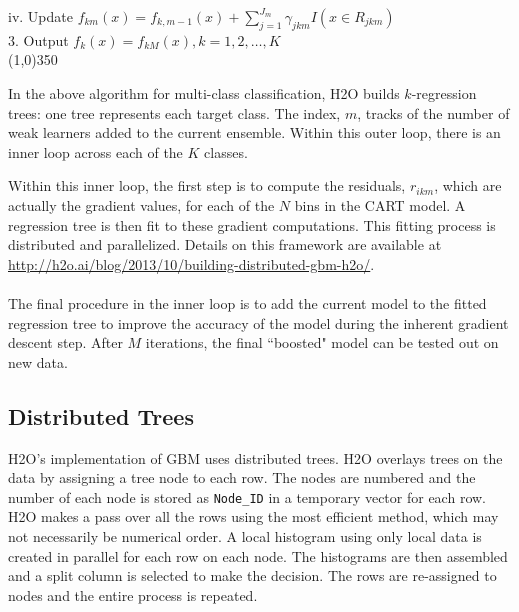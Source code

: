 \hspace{2cm} iv. Update $f_{km}(x) = f_{k,m-1}(x) + \sum_{j=1}^{J_m} \gamma_{jkm} I(x \in R_{jkm})$
\\
3. Output $f_k^{\hat{}}(x) = f_{kM}(x),  k=1,2,\dots,K$
\\
\line(1,0){350}

In the above algorithm for multi-class classification, H2O builds $k$-regression trees: one tree represents each target class. The index, $m$, tracks of the number of weak learners added to the current ensemble. Within this outer loop, there is an inner loop across each of the $K$ classes. 

Within this inner loop, the first step is to compute the residuals, $r_{ikm}$, which are actually the gradient values, for each of the $N$ bins in the CART model. A regression tree is then fit to these gradient computations. This fitting process is distributed and parallelized. Details on this framework are available at {\url{http://h2o.ai/blog/2013/10/building-distributed-gbm-h2o/}}.
\\
\\
The final procedure in the inner loop is to add the current model to the fitted regression tree to improve the accuracy of the model during the inherent gradient descent step. After $M$ iterations, the final ``boosted" model can be tested out on new data.



\subsection{Distributed Trees}

H2O's implementation of GBM uses distributed trees. H2O overlays trees on the data by assigning a tree node to each row.
The nodes are numbered and the number of each node is stored as {\texttt{Node\_ID}} in a temporary vector for each row. H2O makes a pass over all the rows using the most efficient method, which may not necessarily be  numerical order. A local
histogram using only local data is created in parallel for each row on each node. The histograms are then assembled and a split column is selected to make the decision. The rows are re-assigned to nodes and the entire process is repeated.

